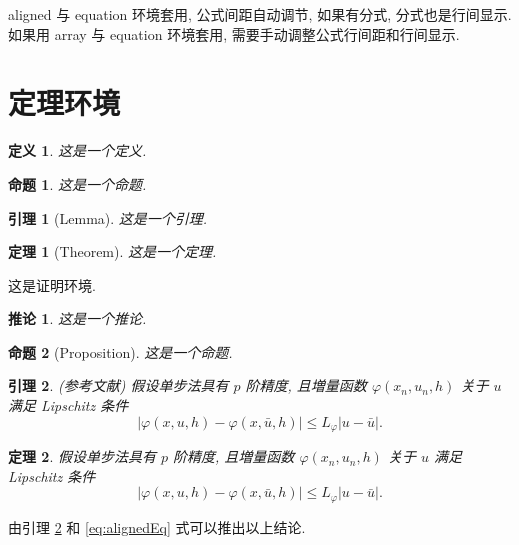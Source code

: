 \documentclass[UTF8,openany,twoside,12pt]{ctexbook}
\makeatletter
\theoremstyle{plain}
\newtheorem{definition}{定义}[chapter]
\newtheorem{proposition}{命题}[chapter]
\newtheorem{lemma}{引理}[chapter]
\newtheorem{theorem}{定理}[chapter]
\newtheorem{corollary}{推论}[chapter]
\renewcommand{\proofname}{\bfseries 证明}
\renewenvironment{proof}[1][\proofname]{\par
  \pushQED{\qed}%
  \normalfont \topsep6\p@\@plus6\p@\relax
  \trivlist
  \item[\hskip\labelsep\bfseries
  #1\@addpunct{\,:\,}]\ignorespaces
}{%
  \popQED\endtrivlist\@endpefalse
}
\makeatother
\begin{document}
aligned 与 equation 环境套用, 公式间距自动调节, 如果有分式, 分式也是行间显示. 如果用 array 与 equation 环境套用, 需要手动调整公式行间距和行间显示.


\section{定理环境}

\begin{definition}\label{def:foo}
这是一个定义.
\end{definition}

\begin{proposition}\label{prop:foo}
这是一个命题.
\end{proposition}

\begin{lemma}[Lemma]\label{lmm:foo}
这是一个引理.
\end{lemma}

\begin{theorem}[Theorem]\label{thm:foo}
这是一个定理.
\end{theorem}
\begin{proof}
这是证明环境.
\end{proof}

\begin{corollary}\label{cor:foo}
这是一个推论.
\end{corollary}

\begin{proposition}[Proposition]
这是一个命题.
\end{proposition}

\begin{lemma}\label{lmm:convergence} {\rm (\textit{参考文献}\cite{LiLiu1997})}
假设单步法具有 $p$ 阶精度, 且増量函数 $\varphi(x_{n}, u_{n}, h)$ 关于 $u$ 满足 \textup{Lipschitz} 条件
\begin{equation}\label{eq:conver1}
|\varphi(x, u, h)-\varphi(x, \bar{u}, h)| \leqslant L_{\varphi}|u-\bar{u}|.
\end{equation}
\end{lemma}

\begin{theorem}\label{thm:convergence}
假设单步法具有 $p$ 阶精度, 且増量函数 $\varphi(x_{n}, u_{n}, h)$ 关于 $u$ 满足\textup{Lipschitz} 条件
\begin{equation}\label{eq:conver2}
|\varphi(x, u, h)-\varphi(x, \bar{u}, h)| \leqslant L_{\varphi}|u-\bar{u}|.
\end{equation}
\end{theorem}
\begin{proof}[\normalfont\bfseries 证明~\nopunct]
由引理 \ref{lmm:convergence} 和 \eqref{eq:alignedEq} 式可以推出以上结论.
\end{proof}
\end{document}
